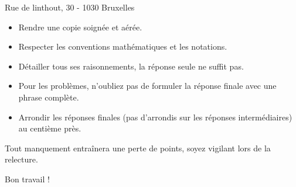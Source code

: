 \documentclass[a4paper, 12pt, parskip=half-, twoside=semi]{scrartcl}
\begin{document}
\begin{scriptsize}%
    Rue de linthout, 30 - 1030 Bruxelles%
\end{scriptsize}%
\par%
\begin{itemize}
    \item Rendre une copie soignée et aérée.
    \item Respecter les conventions mathématiques et les notations.
    \item Détailler tous ses raisonnements, la réponse seule ne suffit pas.
    \item Pour les problèmes, n'oubliez pas de formuler la réponse finale  avec une phrase complète.
    \item Arrondir les réponses finales (pas d'arrondis sur les réponses intermédiaires) au centième près.
\end{itemize}
 Tout manquement entraînera une perte de points, soyez vigilant lors de la relecture.
\vfill
\begin{flushright}
    Bon travail !
\end{flushright}
\cleardoublepage
\pagestyle{plain}
\setcounter{page}{1}
\end{document}
